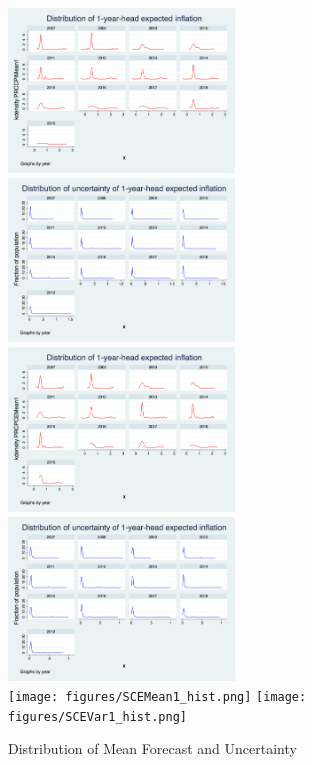 \documentclass[]{article}
\begin{document}
\begin{figure}[h]\label{Unceratitny_Histogram}
	\centering
	\includegraphics[width=6cm]{figures/PRCCPIMean1_hist.png} 
	\includegraphics[width=6cm]{figures/PRCCPIVar1_hist.png}  \\
	\smallskip
		\includegraphics[width=6cm]{figures/PRCPCEMean1_hist.png} 
	\includegraphics[width=6cm]{figures/PRCPCEVar1_hist.png}  \\
	\smallskip
		\texttt{[image: figures/SCEMean1\_hist.png]} 
	\texttt{[image: figures/SCEVar1\_hist.png]}  \\
	\caption{Distribution of Mean Forecast and Uncertainty }
\end{figure}
\end{document}
